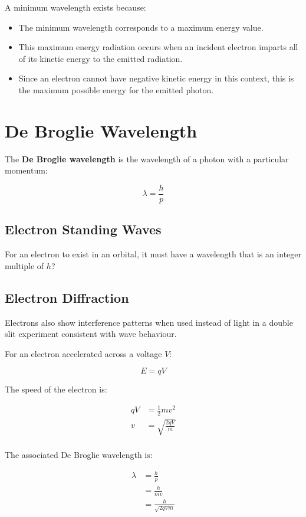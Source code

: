 \documentclass[a4paper,11pt]{report}
\begin{document}
A minimum wavelength exists because:

\begin{itemize}
\item The minimum wavelength corresponds to a maximum energy value.
\item This maximum energy radiation occurs when an incident electron imparts all
	of its kinetic energy to the emitted radiation.
\item Since an electron cannot have negative kinetic energy in this context,
	this is the maximum possible energy for the emitted photon.
\end{itemize}


\section{De Broglie Wavelength}

The \textbf{De Broglie wavelength} is the wavelength of a photon with a
particular momentum:

$$
\lambda = \frac{h}{p}
$$

\subsection{Electron Standing Waves}


For an electron to exist in an orbital, it must have a wavelength that is an
integer multiple of $h$?

\subsection{Electron Diffraction}

Electrons also show interference patterns when used instead of light in a
double slit experiment consistent with wave behaviour.

For an electron accelerated across a voltage $V$:

$$
E = qV
$$

The speed of the electron is:

$$
\begin{aligned}
qV & = \frac{1}{2}mv^2 \\
v & = \sqrt{\frac{2qV}{m}} \\
\end{aligned}
$$

The associated De Broglie wavelength is:

$$
\begin{aligned}
\lambda & = \frac{h}{p} \\
& = \frac{h}{mv} \\
& = \frac{h}{\sqrt{2qVm}} \\
\end{aligned}
$$
\end{document}
